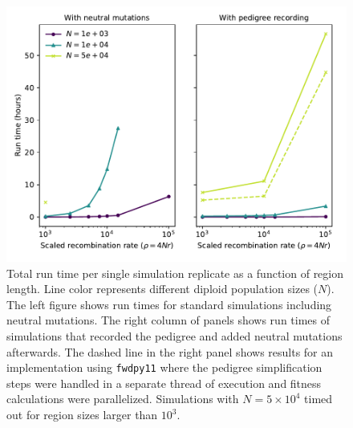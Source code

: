 \documentclass{article}
\newcommand{\fwdpy}{\texttt{fwdpy11}}
\begin{document}
\begin{figure}
    \includegraphics[]{sims/rawspeed}
    \caption{
        \label{fig:runtimes_selection}
    Total run time per single simulation replicate as a function of region length.
    Line color represents different diploid population sizes ($N$).
    The left figure shows run times for standard simulations including neutral mutations.
    The right column of panels shows run times of simulations that recorded the pedigree
    and added neutral mutations afterwards.
    The dashed line in the right panel shows results for an implementation using \fwdpy{}
    where the pedigree simplification steps were handled in a separate thread of execution
    and fitness calculations were parallelized.
    Simulations with $N=5 \times 10^4$ timed out for region sizes larger than $10^3$.
    }
\end{figure}
\end{document}
